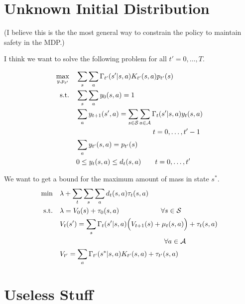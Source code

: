 \section{Unknown Initial Distribution}

(I believe this is the the most general way to constrain the policy to maintain safety in the MDP.)

I think we want to solve the following problem for all $t' = 0,\dots,T$.

\begin{align}
\max_{y,p_{t'}} & \quad \sum_{s} \sum_{a} \Gamma_{t'}(s'|s,a) K_{t'}(s,a)p_{t'}(s) \\
\text{s.t.} & \quad \sum_s \sum_a y_0(s,a) = 1 \notag \\
& \quad \sum_a y_{t+1}(s',a) = \sum_{s \in \mathcal{S}} \sum_{a \in \mathcal{A}} \Gamma_t(s'|s,a) y_t(s,a) \notag \\
& \qquad \qquad \qquad \qquad \qquad \qquad t = 0,\dots,t'-1  \notag \\
& \quad \sum_a y_{t'}(s,a) = p_{t'}(s) \notag \\
& \quad 0 \leq y_t(s,a) \leq d_t(s,a) \qquad t=0,\dots,t' \notag
\end{align}

We want to get a bound for the maximum amount of mass in state $s^*$.  
\begin{align}
\min & \quad \lambda + \sum_t\sum_s\sum_a d_t(s,a)\tau_t(s,a) \\
\text{s.t.} & \quad \lambda = V_0(s)+\tau_0(s,a) \qquad \qquad \qquad \forall s \in \mathcal{S} \notag \\
& \quad V_t(s') = \sum_s \Gamma_t(s'|s,a)\Big(V_{t+1}(s)+\mu_t(s,a)\Big)+\tau_t(s,a) \notag \\
& \qquad \qquad \qquad \qquad \qquad \qquad \qquad \qquad \forall a \in \mathcal{A} \notag \\
& \quad V_{t'} = \sum_a \Gamma_{t'}(s^*|s,a)K_{t'}(s,a) + \tau_{t'}(s,a) \notag
\end{align}


\section{Useless Stuff}

